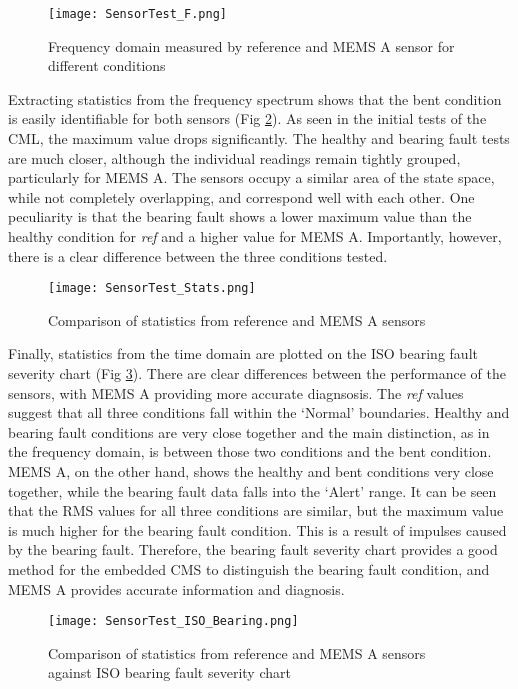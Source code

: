 \begin{figure}
    \centering
    \texttt{[image: SensorTest\_F.png]}
    \caption{Frequency domain measured by reference and MEMS A sensor for different conditions}
    \label{fig:SensorTest_F}
\end{figure}

Extracting statistics from the frequency spectrum shows that the bent condition is easily identifiable for both sensors (Fig \ref{fig:SensorTest_Stats}).
As seen in the initial tests of the CML, the maximum value drops significantly.
The healthy and bearing fault tests are much closer, although the individual readings remain tightly grouped, particularly for MEMS A.
The sensors occupy a similar area of the state space, while not completely overlapping, and correspond well with each other.
One peculiarity is that the bearing fault shows a lower maximum value than the healthy condition for \textit{ref} and a higher value for MEMS A.
Importantly, however, there is a clear difference between the three conditions tested.
\par

\begin{figure}
    \centering
    \texttt{[image: SensorTest\_Stats.png]}
    \caption{Comparison of statistics from reference and MEMS A sensors}
    \label{fig:SensorTest_Stats}
\end{figure}

Finally, statistics from the time domain are plotted on the ISO bearing fault severity chart (Fig \ref{fig:SensorTest_ISO}).
There are clear differences between the performance of the sensors, with MEMS A providing more accurate diagnsosis.
The \textit{ref} values suggest that all three conditions fall within the `Normal' boundaries.
Healthy and bearing fault conditions are very close together and the main distinction, as in the frequency domain, is between those two conditions and the bent condition.
MEMS A, on the other hand, shows the healthy and bent conditions very close together, while the bearing fault data falls into the `Alert' range.
It can be seen that the RMS values for all three conditions are similar, but the maximum value is much higher for the bearing fault condition.
This is a result of impulses caused by the bearing fault.
Therefore, the bearing fault severity chart provides a good method for the embedded CMS to distinguish the bearing fault condition, and MEMS A provides accurate information and diagnosis.

\begin{figure}
    \centering
    \texttt{[image: SensorTest\_ISO\_Bearing.png]}
    \caption{Comparison of statistics from reference and MEMS A sensors against ISO bearing fault severity chart}
    \label{fig:SensorTest_ISO}
\end{figure}

